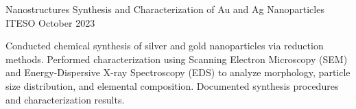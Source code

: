 \begin{cventries}
    \cventry
    {Nanostructures}
    {Synthesis and Characterization of Au and Ag Nanoparticles}
    {ITESO}
    {October 2023}
    {
      \begin{cvitemsNoBullet}
        \item {Conducted chemical synthesis of silver and gold nanoparticles via reduction methods. Performed characterization using
                    \newline Scanning Electron Microscopy (SEM) and Energy-Dispersive X-ray Spectroscopy (EDS) to analyze morphology, particle
                    \newline size distribution, and elemental composition. Documented synthesis procedures and characterization results.}
      \end{cvitemsNoBullet}
    }

\end{cventries}